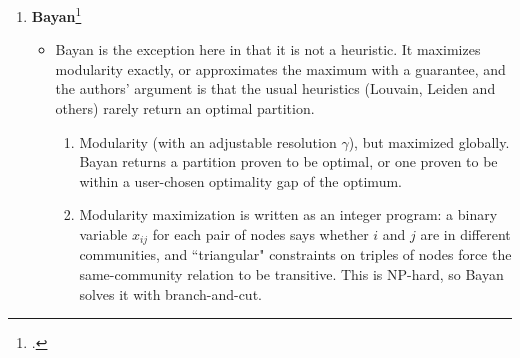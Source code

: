 \documentclass{article}
\begin{document}
\begin{enumerate}
\begin{itemize}
\begin{enumerate}
            \item Published in \textit{Science} 2016. The journal is general-audience, but the authors are in computer science and computational mathematics (Stanford and Purdue), and the worked examples are a neuronal network and a flight network, so it reads as graph technique broadly aimed at multiple network science disciplines. I found it because the same group's follow-up on local higher-order clustering (Yin et al. 2017) is one of the papers SNAP cites for the email-Eu-core network used in Question 2.\footcite{yin2017local} Leskovec is the founder of SNAP. It has been cited over 1100 times.
            \item It works on directed, undirected, weighted, networks, and is most useful when domain knowledge suggests which motif matters. The paper's examples: the fan-like structures as motifs in the \textit{C. elegans} neuronal network, and two-hop motifs in a flight network separated hub airports from geography. It scales well: they found that for triangles it handles networks with billions of edges, with worst-case cost $\Theta(m^{1.5})$ but about $\Theta(m^{1.2})$ measured on 16 real networks, and it can process motifs up to size 9 on networks with hundreds of thousands of edges.
        \end{enumerate}
    \end{itemize}
    \item \textbf{Bayan}\footcite{aref2024bayan}
    \begin{itemize}
        \item Bayan is the exception here in that it is not a heuristic. It maximizes modularity exactly, or approximates the maximum with a guarantee, and the authors' argument is that the usual heuristics (Louvain, Leiden and others) rarely return an optimal partition.
        \begin{enumerate}
            \item Modularity (with an adjustable resolution $\gamma$), but maximized globally. Bayan returns a partition proven to be optimal, or one proven to be within a user-chosen optimality gap of the optimum.
            \item Modularity maximization is written as an integer program: a binary variable $x_{ij}$ for each pair of nodes says whether $i$ and $j$ are in different communities, and ``triangular" constraints on triples of nodes force the same-community relation to be transitive. This is NP-hard, so Bayan solves it with branch-and-cut.

\end{enumerate}
\end{itemize}
\end{enumerate}
\end{document}

